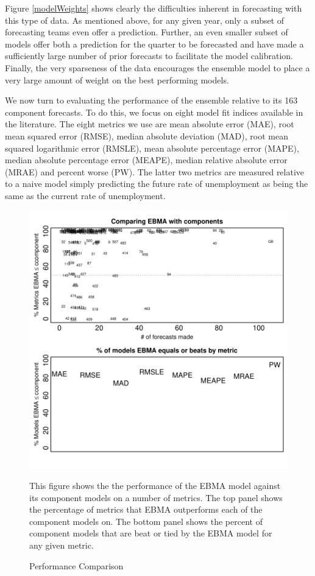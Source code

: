 \documentclass[12pt,fullpage,endnotes]{article}
\begin{document}
Figure \ref{modelWeights} shows clearly the difficulties inherent in
forecasting with this type of data. As mentioned above, for any given year, only a subset
of forecasting teams even offer a prediction.  Further, an even smaller
subset of models offer both a prediction for the quarter to be forecasted and have made a sufficiently large
number of prior forecasts to facilitate the model calibration.  Finally,
the very sparseness of the data encourages the ensemble model to place a very
large amount of weight on the best performing models.

We now turn to evaluating the performance of the ensemble relative to
its 163 component forecasts.  To do this, we focus on eight model fit
indices available in the literature.  The eight metrics we use are
mean absolute error (MAE), root mean squared error (RMSE), median
absolute deviation (MAD), root mean squared logarithmic error (RMSLE),
mean absolute percentage error (MAPE), median absolute percentage
error (MEAPE), median relative absolute error (MRAE) and percent worse
(PW).  The latter two metrics are measured relative to a naive model
simply predicting the future rate of unemployment as being the same as
the current rate of unemployment.


\begin{figure}[h]
\caption{Performance Comparison}
\label{compare2Components}
\begin{center}
\includegraphics{compare2Components}
\end{center}

\footnotesize This figure shows the the performance of the EBMA model against its component models on a number of metrics. The top panel shows the percentage of metrics that EBMA outperforms each of the component models on. The bottom panel shows the percent of component models that are beat or tied by the EBMA model for any given metric. 

\end{figure}
\end{document}
